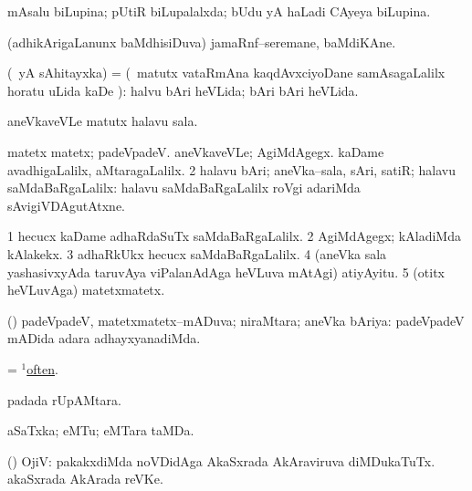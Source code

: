 \bentry
{}
\gl{\gu}
\bmng
mAsalu biLupina; pUtiR biLupalalxda; bUdu yA haLadi CAyeya biLupina. 
\emng
\eentry

\bentry
{}
\gl{\nA}
\bmng
(adhikArigaLanunx baMdhisiDuva) jamaRnf--seremane, baMdiKAne. 
\emng
\eentry

\bentry
{}
\gl{\kirxvi}
\bmng
(\pArxparx\ yA sAhitayxka) =  (\BUkaq\ matutx vataRmAna kaqdAvxciyoDane samAsagaLalilx horatu uLida kaDe \pArxparx):  halvu bAri heVLida; bAri bAri heVLida. 
\emng

\noindent
\gl{\pagu}
\bmng
{} aneVkaveVLe matutx halavu sala. 
\emng
\eentry

\bentry
{}
\gl{\kirxvi}
\bmng
\bnum
{} 
\banum
{} matetx matetx; padeVpadeV. 
 aneVkaveVLe; AgiMdAgegx. 
 kaDame avadhigaLalilx, aMtaragaLalilx. 
\eanum
\numie
\num{2} halavu bAri; aneVka--sala, sAri, satiR; halavu saMdaBaRgaLalilx:  halavu saMdaBaRgaLalilx roVgi adariMda sAvigiVDAgutAtxne. 
\enum
\emng

\noindent
\gl{\pagu}
\bmng
\bnum
\num{1}  hecucx kaDame adhaRdaSuTx saMdaBaRgaLalilx. 
\num{2}  AgiMdAgegx; kAladiMda kAlakekx. 
\num{3}  adhaRkUkx hecucx saMdaBaRgaLalilx. 
\num{4}  (aneVka sala yashasivxyAda taruvAya viPalanAdAga heVLuva mAtAgi) atiyAyitu. 
\num{5}  (otitx heVLuvAga) matetxmatetx. 
\enum
\emng
\eentry

\bentry
{}
\gl{\gu}
\bmng
(\pArxparx) padeVpadeV, matetxmatetx--mADuva; niraMtara; aneVka bAriya:  padeVpadeV mADida adara adhayxyanadiMda. 
\emng
\eentry

\bentry
{}
\gl{\kirxvi}
\bmng
= \hyperlink{often(1)}{$^1$often}. 
\emng
\eentry

\bentry
{}
\gl{\nA}
\bmng
{} padada rUpAMtara. 
\emng
\eentry

\bentry
{}
\gl{\nA}
\bmng
aSaTxka; eMTu; eMTara taMDa. 
\emng
\eentry

\bentry
{}
\gl{\nA}
\bmng
 (\vAshi) OjiV: 
\banum
{} pakakxdiMda noVDidAga  AkaSxrada AkAraviruva diMDukaTuTx. 
  akaSxrada AkArada reVKe. 
\eanum
\emng
\eentry

